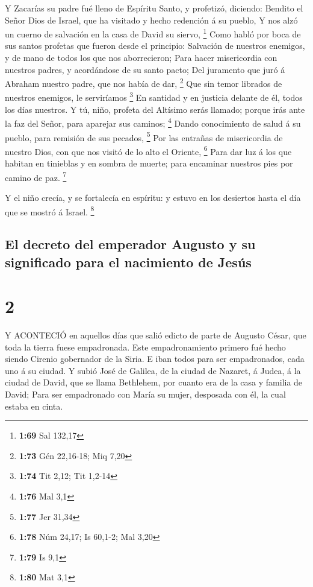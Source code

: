  Y Zacarías su padre fué lleno de Espíritu Santo, y
profetizó, diciendo:  Bendito el Señor Dios de Israel, que
ha visitado y hecho redención á su pueblo,  Y nos alzó un
cuerno de salvación en la casa de David su siervo, \footnote{\textbf{1:69}
  Sal 132,17}  Como habló por boca de sus santos profetas
que fueron desde el principio:  Salvación de nuestros
enemigos, y de mano de todos los que nos aborrecieron; 
Para hacer misericordia con nuestros padres, y acordándose de su santo
pacto;  Del juramento que juró á Abraham nuestro padre, que
nos había de dar, \footnote{\textbf{1:73} Gén 22,16-18; Miq 7,20}
 Que sin temor librados de nuestros enemigos, le
serviríamos \footnote{\textbf{1:74} Tit 2,12; Tit 1,2-14} 
En santidad y en justicia delante de él, todos los días nuestros.
 Y tú, niño, profeta del Altísimo serás llamado; porque
irás ante la faz del Señor, para aparejar sus caminos; \footnote{\textbf{1:76}
  Mal 3,1}  Dando conocimiento de salud á su pueblo, para
remisión de sus pecados, \footnote{\textbf{1:77} Jer 31,34}
 Por las entrañas de misericordia de nuestro Dios, con que
nos visitó de lo alto el Oriente, \footnote{\textbf{1:78} Núm 24,17; Is
  60,1-2; Mal 3,20}  Para dar luz á los que habitan en
tinieblas y en sombra de muerte; para encaminar nuestros pies por camino
de paz. \footnote{\textbf{1:79} Is 9,1}

 Y el niño crecía, y se fortalecía en espíritu: y estuvo en
los desiertos hasta el día que se mostró á Israel. \footnote{\textbf{1:80}
  Mat 3,1}

\hypertarget{el-decreto-del-emperador-augusto-y-su-significado-para-el-nacimiento-de-jesuxfas}{%
\subsection{El decreto del emperador Augusto y su significado para el
nacimiento de
Jesús}\label{el-decreto-del-emperador-augusto-y-su-significado-para-el-nacimiento-de-jesuxfas}}

\hypertarget{section-1}{%
\section{2}\label{section-1}}

 Y ACONTECIÓ en aquellos días que salió edicto de parte de
Augusto César, que toda la tierra fuese empadronada.  Este
empadronamiento primero fué hecho siendo Cirenio gobernador de la Siria.
 E iban todos para ser empadronados, cada uno á su ciudad.
 Y subió José de Galilea, de la ciudad de Nazaret, á Judea,
á la ciudad de David, que se llama Bethlehem, por cuanto era de la casa
y familia de David;  Para ser empadronado con María su
mujer, desposada con él, la cual estaba en cinta.

